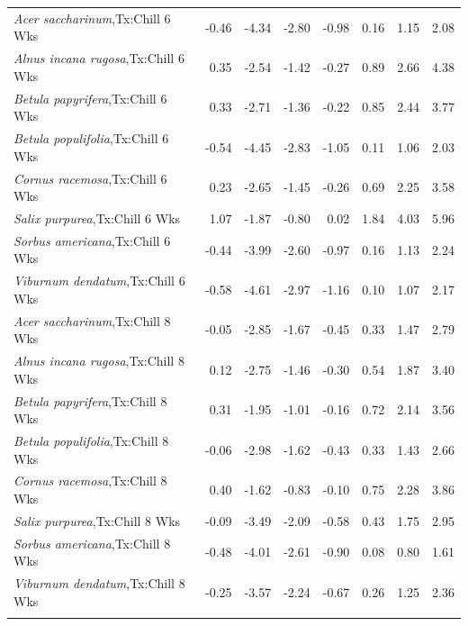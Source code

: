 \documentclass{article}\usepackage[]{graphicx}\usepackage[]{color}
\begin{document}
\begin{longtable}{lrrrrrrr}
  \textit{Acer saccharinum},Tx:Chill 6 Wks & -0.46 & -4.34 & -2.80 & -0.98 & 0.16 & 1.15 & 2.08 \\ 
  \textit{Alnus incana rugosa},Tx:Chill 6 Wks & 0.35 & -2.54 & -1.42 & -0.27 & 0.89 & 2.66 & 4.38 \\ 
  \textit{Betula papyrifera},Tx:Chill 6 Wks & 0.33 & -2.71 & -1.36 & -0.22 & 0.85 & 2.44 & 3.77 \\ 
  \textit{Betula populifolia},Tx:Chill 6 Wks & -0.54 & -4.45 & -2.83 & -1.05 & 0.11 & 1.06 & 2.03 \\ 
  \textit{Cornus racemosa},Tx:Chill 6 Wks & 0.23 & -2.65 & -1.45 & -0.26 & 0.69 & 2.25 & 3.58 \\ 
  \textit{Salix purpurea},Tx:Chill 6 Wks & 1.07 & -1.87 & -0.80 & 0.02 & 1.84 & 4.03 & 5.96 \\ 
  \textit{Sorbus americana},Tx:Chill 6 Wks & -0.44 & -3.99 & -2.60 & -0.97 & 0.16 & 1.13 & 2.24 \\ 
  \textit{Viburnum dendatum},Tx:Chill 6 Wks & -0.58 & -4.61 & -2.97 & -1.16 & 0.10 & 1.07 & 2.17 \\ 
  \textit{Acer saccharinum},Tx:Chill 8 Wks & -0.05 & -2.85 & -1.67 & -0.45 & 0.33 & 1.47 & 2.79 \\ 
  \textit{Alnus incana rugosa},Tx:Chill 8 Wks & 0.12 & -2.75 & -1.46 & -0.30 & 0.54 & 1.87 & 3.40 \\ 
  \textit{Betula papyrifera},Tx:Chill 8 Wks & 0.31 & -1.95 & -1.01 & -0.16 & 0.72 & 2.14 & 3.56 \\ 
  \textit{Betula populifolia},Tx:Chill 8 Wks & -0.06 & -2.98 & -1.62 & -0.43 & 0.33 & 1.43 & 2.66 \\ 
  \textit{Cornus racemosa},Tx:Chill 8 Wks & 0.40 & -1.62 & -0.83 & -0.10 & 0.75 & 2.28 & 3.86 \\ 
  \textit{Salix purpurea},Tx:Chill 8 Wks & -0.09 & -3.49 & -2.09 & -0.58 & 0.43 & 1.75 & 2.95 \\ 
  \textit{Sorbus americana},Tx:Chill 8 Wks & -0.48 & -4.01 & -2.61 & -0.90 & 0.08 & 0.80 & 1.61 \\ 
  \textit{Viburnum dendatum},Tx:Chill 8 Wks & -0.25 & -3.57 & -2.24 & -0.67 & 0.26 & 1.25 & 2.36 \\ 
   \hline
\hline
\label{tab:suppmoddvr}
\end{longtable}
\end{document}
